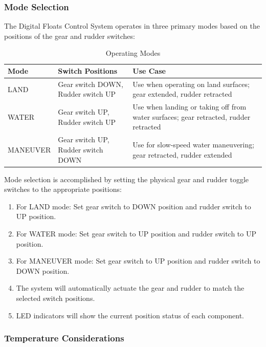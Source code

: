 \documentclass[12pt,a4paper,twoside,openright]{book}
\newcommand{\tabletextfont}{\normalfont\rmfamily}
\newcommand{\tableheadfont}{\normalfont\bfseries}
\begin{document}
\subsubsection{Mode Selection}

The Digital Floats Control System operates in three primary modes based on the positions of the gear and rudder switches:

\begin{table}[h]
    \centering
\setlength{\tabcolsep}{5pt} %
\begin{tabular}{|p{}|p{}|p{}|}
\hline
\tableheadfont\textbf{Mode} & \tableheadfont\textbf{Switch Positions} & \tableheadfont\textbf{Use Case} \\
\hline
\tabletextfont LAND & Gear switch DOWN, Rudder switch UP & Use when operating on land surfaces; gear extended, rudder retracted \\
\hline
\tabletextfont WATER & Gear switch UP, Rudder switch UP & Use when landing or taking off from water surfaces; gear retracted, rudder retracted \\
\hline
\tabletextfont MANEUVER & Gear switch UP, Rudder switch DOWN & Use for slow-speed water maneuvering; gear retracted, rudder extended \\
\hline
\end{tabular}
\caption{Operating Modes}
\end{table}

Mode selection is accomplished by setting the physical gear and rudder toggle switches to the appropriate positions:

\begin{enumerate}
    \item For LAND mode: Set gear switch to DOWN position and rudder switch to UP position.
    \item For WATER mode: Set gear switch to UP position and rudder switch to UP position.
    \item For MANEUVER mode: Set gear switch to UP position and rudder switch to DOWN position.
    \item The system will automatically actuate the gear and rudder to match the selected switch positions.
    \item LED indicators will show the current position status of each component.
\end{enumerate}

\subsubsection{Temperature Considerations}
\end{document}
